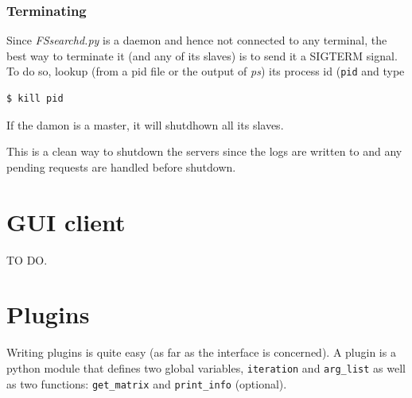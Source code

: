\documentclass[11pt]{article}
\begin{document}
\subsubsection{Terminating}

Since \textit{FSsearchd.py} is a daemon and hence not connected to any terminal, the best way to terminate it (and any of its slaves) is to send it a SIGTERM signal. To do so, lookup (from a pid file or the output of \textit{ps}) its process id (\texttt{pid} and type
\begin{verbatim}
$ kill pid 
\end{verbatim}
If the damon is a master, it will shutdhown all its slaves. 

This is a clean way to shutdown the servers since the logs are written to and any pending requests are handled before shutdown.

\section{GUI client}

TO DO.

\section{Plugins}

Writing plugins is quite easy (as far as the interface is concerned). A plugin is a python module that defines two global variables, \texttt{iteration} and \texttt{arg\_list} as well as two functions: \texttt{get\_matrix} and \texttt{print\_info} (optional).
\end{document}
